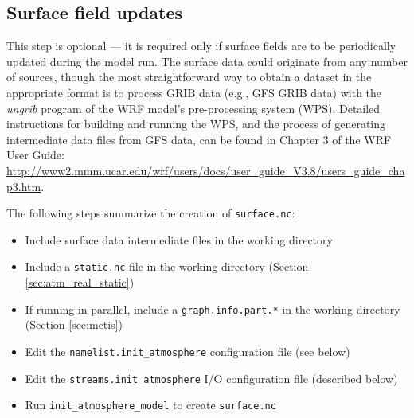 \subsection{Surface field updates}
\label{sec:atm_real_surface}

This step is optional --- it is required only if surface fields are to be periodically updated during the model run.  The surface data could originate from any number of sources, though the most straightforward way to obtain a dataset in the appropriate format is to process GRIB data (e.g., GFS GRIB data) with the {\em ungrib} program of the WRF model's pre-processing system (WPS).  Detailed instructions for building and running the WPS, and the process of generating intermediate data files from GFS data, can be found in Chapter 3 of the WRF User Guide: \url{http://www2.mmm.ucar.edu/wrf/users/docs/user_guide_V3.8/users_guide_chap3.htm}.

The following steps summarize the creation of {\tt surface.nc}:

\begin{itemize}
\item Include surface data intermediate files in the working directory
\item Include a {\tt static.nc} file in the working directory (Section \ref{sec:atm_real_static})
\item If running in parallel, include a {\tt graph.info.part.*} in the working directory (Section \ref{sec:metis})
\item Edit the {\tt namelist.init\_atmosphere} configuration file (see below)
\item Edit the {\tt streams.init\_atmosphere} I/O configuration file (described below)
\item Run {\tt init\_atmosphere\_model} to create {\tt surface.nc}
\end{itemize}


